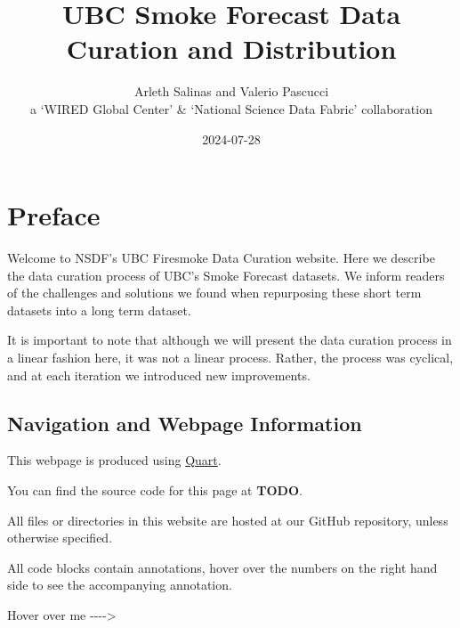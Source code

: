 \documentclass[
  letterpaper,
  DIV=11,
  numbers=noendperiod]{scrreprt}
\title{UBC Smoke Forecast Data Curation and Distribution}
\author{Arleth Salinas and Valerio Pascucci\\
a `WIRED Global Center' \& `National Science Data Fabric' collaboration}
\date{2024-07-28}
\newenvironment{Shaded}{\begin{snugshade}}{\end{snugshade}}
\newcommand{\NormalTok}[1]{\textcolor[rgb]{0.00,0.23,0.31}{#1}}
\newcommand{\OperatorTok}[1]{\textcolor[rgb]{0.37,0.37,0.37}{#1}}
\renewcommand*\contentsname{Table of contents}
\newcommand\contentsname{Table of contents}
\newcommand*\circled[1]{\tikz[baseline=(char.base)]{
          \node[shape=circle,draw,inner sep=1pt] (char) {{\scriptsize#1}};}}
\begin{document}
\maketitle

\renewcommand*\contentsname{Table of contents}
{
\hypersetup{linkcolor=}
\setcounter{tocdepth}{2}
\tableofcontents
}


\chapter*{Preface}\label{preface}


Welcome to NSDF's UBC Firesmoke Data Curation website. Here we describe
the data curation process of UBC's Smoke Forecast datasets. We inform
readers of the challenges and solutions we found when repurposing these
short term datasets into a long term dataset.

It is important to note that although we will present the data curation
process in a linear fashion here, it was not a linear process. Rather,
the process was cyclical, and at each iteration we introduced new
improvements.

\section*{Navigation and Webpage
Information}\label{navigation-and-webpage-information}


This webpage is produced using \href{https://quarto.org/}{Quart}.

You can find the source code for this page at \textbf{TODO}.

All files or directories in this website are hosted at our GitHub
repository, unless otherwise specified.

All code blocks contain annotations, hover over the numbers on the right
hand side to see the accompanying annotation.

\label{annotated-cell-1}%
\begin{Shaded}
\begin{Highlighting}[]
\NormalTok{Hover over me }\OperatorTok{{-}{-}{-}{-}\textgreater{}} \hspace*{\fill}\NormalTok{\circled{1}}
\end{Highlighting}
\end{Shaded}
\end{document}
